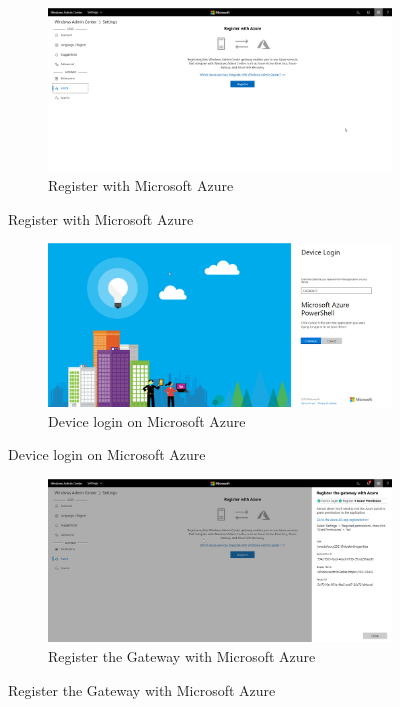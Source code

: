 \label{WACAzure}
\begin{figure}[h]
	\begin{subfigure}{\textwidth}
		\includegraphics[width=0.75\linewidth]{img/StandVanZaken/WAC0.png}
		\captionsetup{width=0.7\linewidth}
		\centering		
		\caption{Register with Microsoft Azure}
	\end{subfigure}
\end{figure}
\begin{figure}[h]\ContinuedFloat
	\begin{subfigure}{\textwidth}
		\captionsetup{width=0.7\linewidth}
		\includegraphics[width=0.75\linewidth]{img/StandVanZaken/WAC1.png}
		\centering
		\caption{Device login on Microsoft Azure}
	\end{subfigure}
\end{figure}
\begin{figure}[h]\ContinuedFloat
\begin{subfigure}{\textwidth}
		\captionsetup{width=0.7\linewidth}
		\includegraphics[width=0.75\linewidth]{img/StandVanZaken/WAC2.png}
		\centering
		\caption{Register the Gateway with Microsoft Azure}
	\end{subfigure}
\end{figure}
